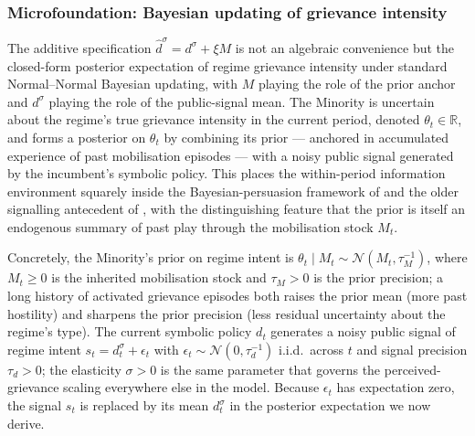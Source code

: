 \documentclass[11pt,twoside]{extarticle}
\begin{document}
\subsubsection*{Microfoundation: Bayesian updating of grievance intensity}

The additive specification $\hat d^\sigma=d^\sigma+\xi M$ is not an algebraic convenience but the closed-form posterior expectation of regime grievance intensity under standard Normal--Normal Bayesian updating, with $M$ playing the role of the prior anchor and $d^\sigma$ playing the role of the public-signal mean. The Minority is uncertain about the regime's true grievance intensity in the current period, denoted $\theta_t\in\mathbb R$, and forms a posterior on $\theta_t$ by combining its prior --- anchored in accumulated experience of past mobilisation episodes --- with a noisy public signal generated by the incumbent's symbolic policy. This places the within-period information environment squarely inside the Bayesian-persuasion framework of \citet{kamenicaGentzkowBayesianPersuasion2011} and the older signalling antecedent of \citet{crawfordSobelStrategicInformation1982}, with the distinguishing feature that the prior is itself an endogenous summary of past play through the mobilisation stock $M_t$.

Concretely, the Minority's prior on regime intent is $\theta_t\mid M_t\sim\mathcal{N}(M_t,\tau_M^{-1})$, where $M_t\ge 0$ is the inherited mobilisation stock and $\tau_M>0$ is the prior precision; a long history of activated grievance episodes both raises the prior mean (more past hostility) and sharpens the prior precision (less residual uncertainty about the regime's type). The current symbolic policy $d_t$ generates a noisy public signal of regime intent $s_t=d_t^\sigma+\epsilon_t$ with $\epsilon_t\sim\mathcal{N}(0,\tau_d^{-1})$ i.i.d.\ across $t$ and signal precision $\tau_d>0$; the elasticity $\sigma>0$ is the same parameter that governs the perceived-grievance scaling everywhere else in the model. Because $\epsilon_t$ has expectation zero, the signal $s_t$ is replaced by its mean $d_t^\sigma$ in the posterior expectation we now derive.
\end{document}

